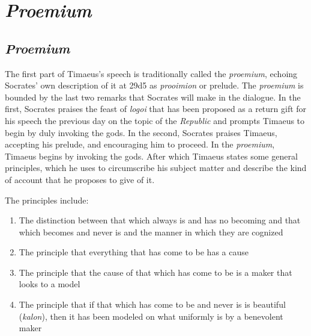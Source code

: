
\chapter{\emph{Proemium}} %
\label{cha:proemium}

%
%


\section{\emph{Proemium}} %
\label{sec:proemium}

The first part of Timaeus's speech is traditionally called the \emph{proemium}, echoing Socrates' own description of it at 29d5 as \emph{prooimion} or prelude. The \emph{proemium} is bounded by the last two remarks that Socrates will make in the dialogue. In the first, Socrates praises the feast of \emph{logoi} that has been proposed as a return gift for his speech the previous day on the topic of the \emph{Republic} and prompts Timaeus to begin by duly invoking the gods. In the second, Socrates praises Timaeus, accepting his prelude, and encouraging him to proceed. In the \emph{proemium}, Timaeus begins by invoking the gods. After which Timaeus states some general principles, which he uses to circumscribe his subject matter and describe the kind of account that he proposes to give of it. 

The principles include:
\begin{enumerate}[(1)]
	\item The distinction between that which always is and has no becoming and that which becomes and never is and the manner in which they are cognized
	\item The principle that everything that has come to be has a cause
	\item The principle that the cause of that which has come to be is a maker that looks to a model
	\item The principle that if that which has come to be and never is is beautiful (\emph{kalon}), then it has been modeled on what uniformly is by a benevolent maker
\end{enumerate}

